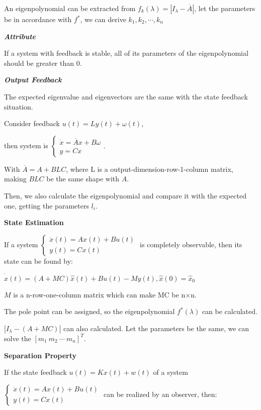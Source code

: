 \documentclass{article}
\newcommand{\bigtitle}[1]{
	\noindent
	\textbf{#1}
}
\newcommand{\smalltitle}[1]{
	\noindent
	\textbf{\textit{#1}}
}
\begin{document}
\begin{spacing}{1.2}
An eigenpolynomial can be extracted from $f_k(\lambda) = |I_\lambda - \overline{A}|$, let the parameters be in accordance with $f^*$, we can derive $k_1, k_2, \cdots, k_n$

\smalltitle{Attribute}

If a system with feedback is stable, all of its parameters of the eigenpolynomial should be greater than 0.


\smalltitle{Output Feedback}

The expected eigenvalue and eigenvectors are the same with the state feedback situation.

Consider feedback $u(t) = Ly(t) + \omega(t)$, 

then system is $\left\{\begin{array}{l}{\dot{x}=\overline{A} x+B \omega} \\ {y=C x}\end{array}\right.$.

With $\overline{A} = A+BLC$, where L is a output-dimension-row-1-column matrix, making $BLC$ be the same shape with $A$.

Then, we also calculate the eigenpolynomial and compare it with the expected one, getting the parameters $l_i$.


\bigtitle{State Estimation}

If a system $
\left\lbrace
\begin{array}{l}
\dot{x}(t) = Ax(t) + Bu(t) \\
y(t) = Cx(t)
\end{array}
\right.
$
is completely observable, then its state can be found by:

$\dot{\hat{x}}(t) = (A+MC)\hat{x}(t) + Bu(t) - My(t), \hat{x}(0) = \hat{x}_0$

$M$ is a n-row-one-column matrix which can make MC be n$\times$n.

The pole point can be assigned, so the eigenpolynomial $f^*(\lambda)$ can be calculated.

$
|I_\lambda - (A+MC)|
$ can also calculated. Let the parameters be the same, we can solve the $[m_1\ m_2\ \cdots\ m_n]^T$.


\bigtitle{Separation Property}

If the state feedback $u(t)=K x(t)+w(t)$ of a system

$\left\{\begin{array}{c}{\dot{x}(t)=A x(t)+B u(t)} \\ {y(t)=C x(t)}\end{array}\right.$
can be realized by an observer, then:


\end{spacing}
\end{document}
